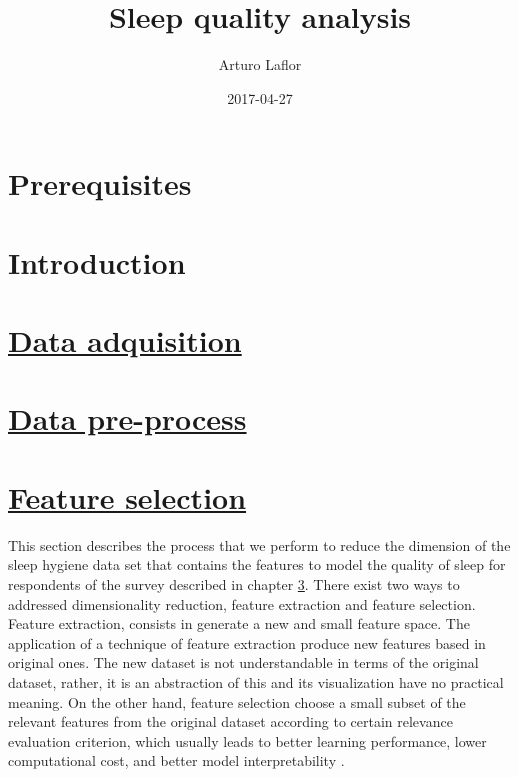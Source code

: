\documentclass[]{book}
\title{Sleep quality analysis}
\author{Arturo Laflor}
\date{2017-04-27}
\begin{document}
\maketitle

{
\setcounter{tocdepth}{1}
\tableofcontents
}
\chapter{Prerequisites}\label{prerequisites}

\chapter{Introduction}\label{intro}

\hypertarget{data-adquisition}{\chapter{\texorpdfstring{\protect\hyperlink{data-adquisition}{Data
adquisition}}{Data adquisition}}\label{data-adquisition}}

\chapter{\texorpdfstring{\protect\hyperlink{data-preprocess}{Data
pre-process}}{Data pre-process}}\label{data-pre-process}

\hypertarget{feature-selection}{\chapter{\texorpdfstring{\protect\hyperlink{feature-selection}{Feature
selection}}{Feature selection}}\label{feature-selection}}

This section describes the process that we perform to reduce the
dimension of the sleep hygiene data set that contains the features to
model the quality of sleep for respondents of the survey described in
chapter \ref{data-adquisition}. There exist two ways to addressed
dimensionality reduction, feature extraction and feature selection.
Feature extraction, consists in generate a new and small feature space.
The application of a technique of feature extraction produce new
features based in original ones. The new dataset is not understandable
in terms of the original dataset, rather, it is an abstraction of this
and its visualization have no practical meaning. On the other hand,
feature selection choose a small subset of the relevant features from
the original dataset according to certain relevance evaluation
criterion, which usually leads to better learning performance, lower
computational cost, and better model interpretability \citep{Tang2014}.
\end{document}
